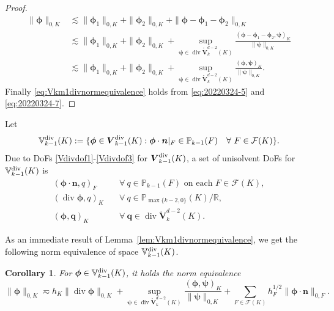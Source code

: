 \documentclass[10pt]{amsart}
\newtheorem{corollary}[theorem]{Corollary}
\renewcommand{\div}{\operatorname{div}}
\numberwithin{equation}{section}
\begin{document}
\begin{proof}
\begin{align*}  
\|\boldsymbol{\phi}\|_{0,K}&\lesssim \|\boldsymbol{\phi}_1\|_{0,K}+\|\boldsymbol{\phi}_2\|_{0,K}+\|\boldsymbol{\phi}-\boldsymbol{\phi}_1-\boldsymbol{\phi}_2\|_{0,K} \\
&\lesssim \|\boldsymbol{\phi}_1\|_{0,K}+\|\boldsymbol{\phi}_2\|_{0,K}+\sup_{\boldsymbol{\psi}\in\div\mathring{\boldsymbol{V}}_{k}^{d-2}(K)}\frac{(\boldsymbol{\phi}-\boldsymbol{\phi}_1-\boldsymbol{\phi}_2, \boldsymbol{\psi})_K}{\|\boldsymbol{\psi}\|_{0,K}} \\
&\lesssim \|\boldsymbol{\phi}_1\|_{0,K}+\|\boldsymbol{\phi}_2\|_{0,K}+\sup_{\boldsymbol{\psi}\in\div\mathring{\boldsymbol{V}}_{k}^{d-2}(K)}\frac{(\boldsymbol{\phi}, \boldsymbol{\psi})_K}{\|\boldsymbol{\psi}\|_{0,K}}.
\end{align*}
Finally \eqref{eq:Vkm1divnormequivalence} holds from \eqref{eq:20220324-5} and \eqref{eq:20220324-7}.
\end{proof}


Let 
\[
\mathbb{V}_{k-1}^{\rm div}(K):=\{\boldsymbol{\phi}\in\boldsymbol{V}_{k-1}^{\rm div}(K): \boldsymbol{\phi}\cdot\boldsymbol{n}|_F\in\mathbb P_{k-1}(F) \quad\forall~F\in\mathcal F(K)\}.
\]
Due to DoFs \eqref{Vdivdof1}-\eqref{Vdivdof3} for $\boldsymbol{V}_{k-1}^{\rm div}(K)$, a set of unisolvent DoFs for $\mathbb{V}_{k-1}^{\rm div}(K)$ is 
\begin{align}
    (\boldsymbol{\phi}\cdot\boldsymbol{n}, q)_F & \quad\forall~q\in\mathbb P_{k-1}(F) \textrm{ on each }  F\in\mathcal F(K), \label{Vpdivdof1}\\
    (\div\boldsymbol{\phi}, q)_K & \quad\forall~q\in\mathbb P_{\max\{k-2,0\}}(K)/\mathbb R, \label{Vpdivdof2} \\
    (\boldsymbol{\phi}, \boldsymbol{q})_K & \quad\forall~\boldsymbol{q}\in \div\mathring{\boldsymbol{V}}_{k}^{d-2}(K). \label{Vpdivdof3}
\end{align}

As an immediate result of Lemma~\ref{lem:Vkm1divnormequivalence}, we get the following norm equivalence of space $\mathbb{V}_{k-1}^{\rm div}(K)$.
\begin{corollary}
For $\boldsymbol{\phi}\in\mathbb{V}_{k-1}^{\rm div}(K)$, it holds the norm equivalence
\begin{equation}\label{eq:Vkm1divnormequiv}
\|\boldsymbol{\phi}\|_{0,K}\eqsim h_K\|\div\boldsymbol{\phi}\|_{0,K} + \sup_{\boldsymbol{\psi}\in\div\mathring{\boldsymbol{V}}_{k}^{d-2}(K)}\frac{(\boldsymbol{\phi}, \boldsymbol{\psi})_K}{\|\boldsymbol{\psi}\|_{0,K}} +\sum_{F\in\mathcal F(K)}h_F^{1/2}\|\boldsymbol{\phi}\cdot\boldsymbol{n}\|_{0,F}.
\end{equation}
\end{corollary}
\end{document}
